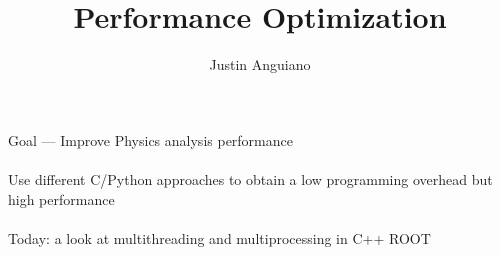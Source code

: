 \documentclass[10pt]{beamer}
\author{Justin Anguiano}
\title{Performance Optimization}
\begin{document}
\begin{frame}
\titlepage
\end{frame}


\begin{frame}{}
Goal --- Improve Physics analysis performance \\
\quad \quad \\
Use different C/Python approaches to obtain a low programming overhead but high performance\\ 

\quad \quad \\
Today: a look at multithreading and multiprocessing in C++ ROOT
\end{frame}
\end{document}
